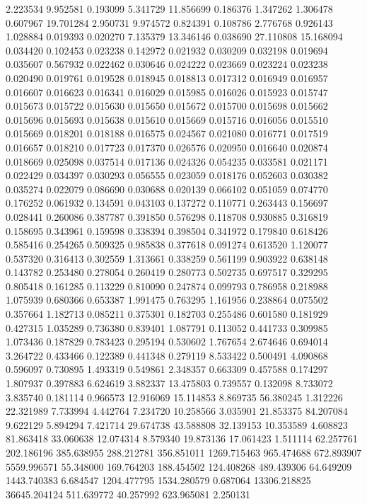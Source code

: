 2.223534
9.952581
0.193099
5.341729
11.856699
0.186376
1.347262
1.306478
0.607967
19.701284
2.950731
9.974572
0.824391
0.108786
2.776768
0.926143
1.028884
0.019393
0.020270
7.135379
13.346146
0.038690
27.110808
15.168094
0.034420
0.102453
0.023238
0.142972
0.021932
0.030209
0.032198
0.019694
0.035607
0.567932
0.022462
0.030646
0.024222
0.023669
0.023224
0.023238
0.020490
0.019761
0.019528
0.018945
0.018813
0.017312
0.016949
0.016957
0.016607
0.016623
0.016341
0.016029
0.015985
0.016026
0.015923
0.015747
0.015673
0.015722
0.015630
0.015650
0.015672
0.015700
0.015698
0.015662
0.015696
0.015693
0.015638
0.015610
0.015669
0.015716
0.016056
0.015510
0.015669
0.018201
0.018188
0.016575
0.024567
0.021080
0.016771
0.017519
0.016657
0.018210
0.017723
0.017370
0.026576
0.020950
0.016640
0.020874
0.018669
0.025098
0.037514
0.017136
0.024326
0.054235
0.033581
0.021171
0.022429
0.034397
0.030293
0.056555
0.023059
0.018176
0.052603
0.030382
0.035274
0.022079
0.086690
0.030688
0.020139
0.066102
0.051059
0.074770
0.176252
0.061932
0.134591
0.043103
0.137272
0.110771
0.263443
0.156697
0.028441
0.260086
0.387787
0.391850
0.576298
0.118708
0.930885
0.316819
0.158695
0.343961
0.159598
0.338394
0.398504
0.341972
0.179840
0.618426
0.585416
0.254265
0.509325
0.985838
0.377618
0.091274
0.613520
1.120077
0.537320
0.316413
0.302559
1.313661
0.338259
0.561199
0.903922
0.638148
0.143782
0.253480
0.278054
0.260419
0.280773
0.502735
0.697517
0.329295
0.805418
0.161285
0.113229
0.810090
0.247874
0.099793
0.786958
0.218988
1.075939
0.680366
0.653387
1.991475
0.763295
1.161956
0.238864
0.075502
0.357664
1.182713
0.085211
0.375301
0.182703
0.255486
0.601580
0.181929
0.427315
1.035289
0.736380
0.839401
1.087791
0.113052
0.441733
0.309985
1.073436
0.187829
0.783423
0.295194
0.530602
1.767654
2.674646
0.694014
3.264722
0.433466
0.122389
0.441348
0.279119
8.533422
0.500491
4.090868
0.596097
0.730895
1.493319
0.549861
2.348357
0.663309
0.457588
0.174297
1.807937
0.397883
6.624619
3.882337
13.475803
0.739557
0.132098
8.733072
3.835740
0.181114
0.966573
12.916069
15.114853
8.869735
56.380245
1.312226
22.321989
7.733994
4.442764
7.234720
10.258566
3.035901
21.853375
84.207084
9.622129
5.894294
7.421714
29.674738
43.588808
32.139153
10.353589
4.608823
81.863418
33.060638
12.074314
8.579340
19.873136
17.061423
1.511114
62.257761
202.186196
385.638955
288.212781
356.851011
1269.715463
965.474688
672.893907
5559.996571
55.348000
169.764203
188.454502
124.408268
489.439306
64.649209
1443.740383
6.684547
1204.477795
1534.280579
0.687064
13306.218825
36645.204124
511.639772
40.257992
623.965081
2.250131
